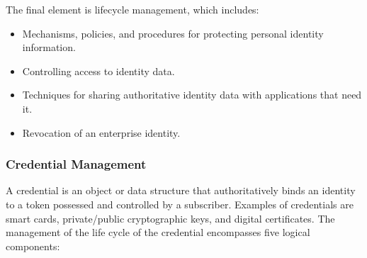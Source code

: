 \documentclass{article}
\begin{document}
                                    The final element is lifecycle management, which includes:

                                    \begin{itemize}
                                        \item Mechanisms, policies, and procedures for protecting personal identity information.
                                        \item Controlling access to identity data.
                                        \item Techniques for sharing authoritative identity data with applications that need it.
                                        \item Revocation of an enterprise identity.
                                    \end{itemize}

                                    \subsubsection{Credential Management}
                                    A credential is an object or data structure that
                                    authoritatively binds an identity to a token possessed and
                                    controlled by a subscriber. Examples of credentials are smart cards, private/public
                                    cryptographic keys, and digital certificates. The management of the life cycle of the credential
                                    encompasses five logical components:
\end{document}
